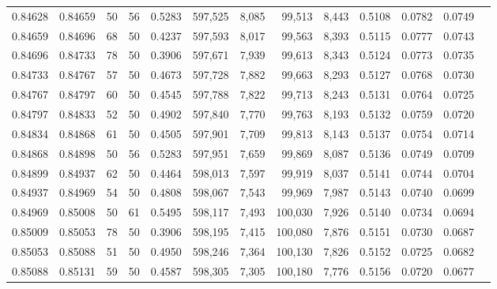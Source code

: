 \begin{tabular}{rrrrrrrrrrrrr}
0.84628 & 0.84659 &    50 &  56 &                                     0.5283 & 597,525 &   8,085 &  99,513 &   8,443 & 0.5108 & 0.0782 & 0.0749 \\
0.84659 & 0.84696 &    68 &  50 &                                     0.4237 & 597,593 &   8,017 &  99,563 &   8,393 & 0.5115 & 0.0777 & 0.0743 \\
0.84696 & 0.84733 &    78 &  50 &                                     0.3906 & 597,671 &   7,939 &  99,613 &   8,343 & 0.5124 & 0.0773 & 0.0735 \\
0.84733 & 0.84767 &    57 &  50 &                                     0.4673 & 597,728 &   7,882 &  99,663 &   8,293 & 0.5127 & 0.0768 & 0.0730 \\
0.84767 & 0.84797 &    60 &  50 &                                     0.4545 & 597,788 &   7,822 &  99,713 &   8,243 & 0.5131 & 0.0764 & 0.0725 \\
0.84797 & 0.84833 &    52 &  50 &                                     0.4902 & 597,840 &   7,770 &  99,763 &   8,193 & 0.5132 & 0.0759 & 0.0720 \\
0.84834 & 0.84868 &    61 &  50 &                                     0.4505 & 597,901 &   7,709 &  99,813 &   8,143 & 0.5137 & 0.0754 & 0.0714 \\
0.84868 & 0.84898 &    50 &  56 &                                     0.5283 & 597,951 &   7,659 &  99,869 &   8,087 & 0.5136 & 0.0749 & 0.0709 \\
0.84899 & 0.84937 &    62 &  50 &                                     0.4464 & 598,013 &   7,597 &  99,919 &   8,037 & 0.5141 & 0.0744 & 0.0704 \\
0.84937 & 0.84969 &    54 &  50 &                                     0.4808 & 598,067 &   7,543 &  99,969 &   7,987 & 0.5143 & 0.0740 & 0.0699 \\
0.84969 & 0.85008 &    50 &  61 &                                     0.5495 & 598,117 &   7,493 & 100,030 &   7,926 & 0.5140 & 0.0734 & 0.0694 \\
0.85009 & 0.85053 &    78 &  50 &                                     0.3906 & 598,195 &   7,415 & 100,080 &   7,876 & 0.5151 & 0.0730 & 0.0687 \\
0.85053 & 0.85088 &    51 &  50 &                                     0.4950 & 598,246 &   7,364 & 100,130 &   7,826 & 0.5152 & 0.0725 & 0.0682 \\
0.85088 & 0.85131 &    59 &  50 &                                     0.4587 & 598,305 &   7,305 & 100,180 &   7,776 & 0.5156 & 0.0720 & 0.0677 \\

\end{tabular}
